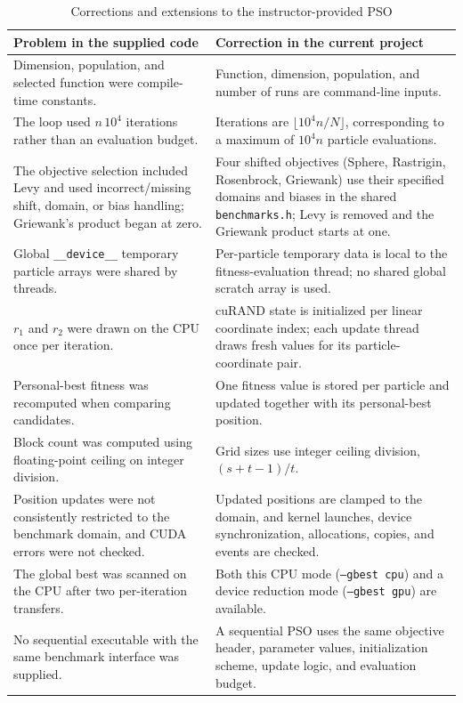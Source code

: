 \documentclass[conference]{IEEEtran}
\begin{document}
\begin{table}[t]
\centering
\caption{Corrections and extensions to the instructor-provided PSO}
\label{tab:corrections}
\begin{tabular}{p{}p{}}
\toprule
\textbf{Problem in the supplied code} & \textbf{Correction in the current project}\\
\midrule
Dimension, population, and selected function were compile-time constants.
& Function, dimension, population, and number of runs are command-line inputs.\\
The loop used $n\,10^4$ iterations rather than an evaluation budget.
& Iterations are $\lfloor 10^4 n/N\rfloor$, corresponding to a maximum of
$10^4 n$ particle evaluations.\\
The objective selection included Levy and used incorrect/missing shift,
domain, or bias handling; Griewank's product began at zero.
& Four shifted objectives (Sphere, Rastrigin, Rosenbrock, Griewank) use their
specified domains and biases in the shared \texttt{benchmarks.h}; Levy is
removed and the Griewank product starts at one.\\
Global \texttt{\_\_device\_\_} temporary particle arrays were shared by threads.
& Per-particle temporary data is local to the fitness-evaluation thread; no
shared global scratch array is used.\\
$r_1$ and $r_2$ were drawn on the CPU once per iteration.
& cuRAND state is initialized per linear coordinate index; each update thread
draws fresh values for its particle-coordinate pair.\\
Personal-best fitness was recomputed when comparing candidates.
& One fitness value is stored per particle and updated together with its
personal-best position.\\
Block count was computed using floating-point ceiling on integer division.
& Grid sizes use integer ceiling division, $(s+t-1)/t$.\\
Position updates were not consistently restricted to the benchmark domain,
and CUDA errors were not checked.
& Updated positions are clamped to the domain, and kernel launches, device
synchronization, allocations, copies, and events are checked.\\
The global best was scanned on the CPU after two per-iteration transfers.
& Both this CPU mode (\texttt{--gbest cpu}) and a device reduction mode
(\texttt{--gbest gpu}) are available.\\
No sequential executable with the same benchmark interface was supplied.
& A sequential PSO uses the same objective header, parameter values,
initialization scheme, update logic, and evaluation budget.\\
\bottomrule
\end{tabular}
\end{table}
\end{document}

